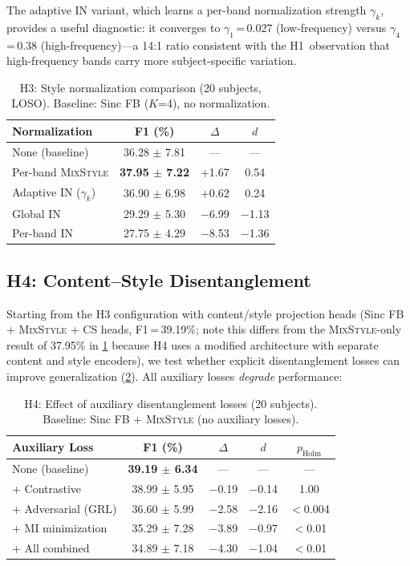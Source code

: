 \documentclass[conference]{IEEEtran}
\newcommand{\mixstyle}{\textsc{MixStyle}}
\begin{document}
The adaptive IN variant, which learns a per-band normalization strength $\gamma_k$, provides a useful diagnostic: it converges to $\gamma_1$\,=\,0.027 (low-frequency) versus $\gamma_4$\,=\,0.38 (high-frequency)---a 14:1 ratio consistent with the H1~observation that high-frequency bands carry more subject-specific variation.

\begin{table}[t]
\centering
\caption{H3: Style normalization comparison (20 subjects, LOSO). Baseline: Sinc FB ($K$=4), no normalization.}
\label{tab:h3}
\begin{tabular}{lccc}
\toprule
Normalization & F1 (\%) & $\Delta$ & $d$ \\
\midrule
None (baseline) & 36.28 $\pm$ 7.81 & --- & --- \\
Per-band \mixstyle{} & \textbf{37.95 $\pm$ 7.22} & +1.67 & 0.54 \\
Adaptive IN ($\gamma_k$) & 36.90 $\pm$ 6.98 & +0.62 & 0.24 \\
Global IN & 29.29 $\pm$ 5.30 & $-$6.99 & $-$1.13 \\
Per-band IN & 27.75 $\pm$ 4.29 & $-$8.53 & $-$1.36 \\
\bottomrule
\end{tabular}
\end{table}

\subsection{H4: Content--Style Disentanglement}

Starting from the H3 configuration with content/style projection heads (Sinc FB + \mixstyle{} + CS heads, F1\,=\,39.19\%; note this differs from the \mixstyle{}-only result of 37.95\% in \cref{tab:h3} because H4 uses a modified architecture with separate content and style encoders), we test whether explicit disentanglement losses can improve generalization (\cref{tab:h4}).
All auxiliary losses \emph{degrade} performance:

\begin{table}[t]
\centering
\caption{H4: Effect of auxiliary disentanglement losses (20 subjects). Baseline: Sinc FB + \mixstyle{} (no auxiliary losses).}
\label{tab:h4}
\begin{tabular}{lcccc}
\toprule
Auxiliary Loss & F1 (\%) & $\Delta$ & $d$ & $p_{\mathrm{Holm}}$ \\
\midrule
None (baseline) & \textbf{39.19 $\pm$ 6.34} & --- & --- & --- \\
+ Contrastive & 38.99 $\pm$ 5.95 & $-$0.19 & $-$0.14 & 1.00 \\
+ Adversarial (GRL) & 36.60 $\pm$ 5.99 & $-$2.58 & $-$2.16 & $<$0.004 \\
+ MI minimization & 35.29 $\pm$ 7.28 & $-$3.89 & $-$0.97 & $<$0.01 \\
+ All combined & 34.89 $\pm$ 7.18 & $-$4.30 & $-$1.04 & $<$0.01 \\
\bottomrule
\end{tabular}
\end{table}
\end{document}
